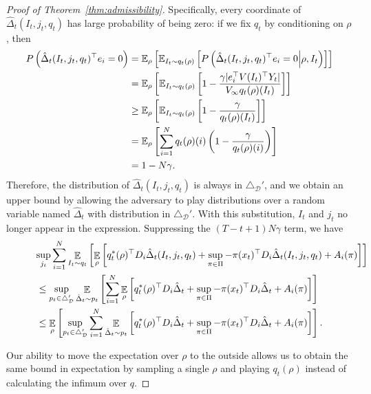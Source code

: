 \documentclass{article}
\begin{document}
\begin{proof}[Proof of Theorem~\ref{thm:admissibility}]
Specifically, every coordinate of $\hat\Delta_t(I_t,j_t,q_t)$  has large probability of being zero: if we fix $q_t$ by conditioning on $\rho$, then
\begin{align*}
  P\left(\hat\Delta_t(I_t,j_t,q_t)^\top e_i = 0 \right)
  &=
    \mathbb E_{\rho}\left[ \mathbb E_{I_t \sim q_t(\rho)}\left[ P\left(\hat\Delta_t(I_t,j_t,q_t)^\top e_i = 0 \middle |\rho, I_t\right)\right]\right]\\
    &=
    \mathbb E_{\rho}\left[ \mathbb E_{I_t \sim q_t(\rho)}\left[
    1-\frac{\gamma \vert e_i^\top V(I_t)^\top Y_t\vert }{V_\infty q_t(\rho)(I_t)}
    \right]\right]\\
  &\geq
    \mathbb E_{\rho}\left[ \mathbb E_{I_t \sim q_t(\rho)}\left[
    1-\frac{\gamma}{q_t(\rho)(I_t)}
    \right]\right]\\
  &= \mathbb E_{\rho}\left[
    \sum_{i=1}^N q_t(\rho)(i) \left(1- \frac{\gamma}{q_t(\rho)(i)}\right)\right]\\
  &= 1 - N \gamma.
\end{align*}
Therefore, the distribution of $\hat\Delta_t(I_t,j_t,q_t)$ is always in $\triangle_{\mathcal D}'$, and we obtain an upper bound by allowing the adversary to play distributions over a random variable named $\hat\Delta_t$ with distribution in $\triangle_{\mathcal D}'$. With this substitution, $I_t$ and $j_t$ no longer appear in the expression. Suppressing the $(T-t+1)N\gamma$ term, we have
\begin{align*}
  &\lefteqn{
        \sup_{j_t } \sum_{i=1}^N\mathop{\ex}_{I_t\sim q_t}\left[\mathop{\ex}_{\rho}\left[ q_t^*(\rho)^\top D_i \hat \Delta_t(I_t,j_t,q_t)
    +
    \sup_{\pi\in\Pi} -\pi(x_t)^\top D_i\hat\Delta_t(I_t,j_t,q_t) + A_i(\pi)\right]\right]
    }\\
  &\leq
    \sup_{p_t\in\triangle_{\mathcal D}'} \mathop{\ex}_{\hat\Delta_t\sim p_t}\left[
    \sum_{i=1}^N\mathop{\ex}_{\rho}\left[ q_t^*(\rho)^\top D_i \hat \Delta_t
    +
    \sup_{\pi\in\Pi} -\pi(x_t)^\top D_i\hat\Delta_t + A_i(\pi)\right]\right]\\
    &\leq
\mathop{\ex}_{\rho}\left[ \sup_{p_t\in\triangle_{\mathcal D}'}\sum_{i=1}^N \mathop{\ex}_{\hat\Delta_t\sim p_t}\left[ q_t^*(\rho)^\top D_i \hat \Delta_t
    +
  \sup_{\pi\in\Pi} -\pi(x_t)^\top D_i\hat\Delta_t + A_i(\pi)\right]\right].
\end{align*}

Our ability to move the expectation over $\rho$ to the outside allows us to obtain the same bound in expectation by sampling a single $\rho$ and playing $q_t(\rho)$ instead of calculating the infimum over $q$. 


\end{proof}
\end{document}
